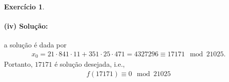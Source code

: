 \documentclass[a4paper,12pt]{article}
\theoremstyle{definition}
\newtheorem{exercise}{Exercício}%
\begin{document}
\begin{exercise}
		\paragraph{(iv) Solução:} a solução é dada por
		\begin{align*}
		x_0 = 21\cdot 841\cdot 11 + 351\cdot 25\cdot 471 = 4327296 \equiv 17171\mod 21025.
		\end{align*}
		Portanto, $17171$ é solução desejada, i.e.,
		\begin{align*}
		f(17171) \equiv 0\mod 21025
		\end{align*}
	\end{exercise}
	
	
	
	
	
	
	
	
	
\end{document}

